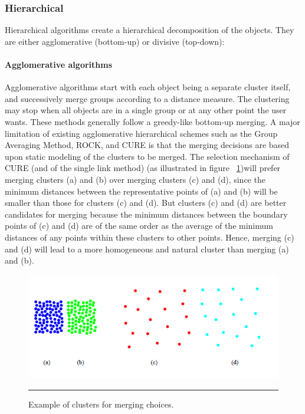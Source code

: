 \subsubsection{Hierarchical}
Hierarchical algorithms create a hierarchical decomposition of the objects. They are either
agglomerative (bottom-up) or divisive (top-down):
\paragraph{Agglomerative algorithms}
Agglomerative algorithms start with each object being a separate cluster itself, and successively
merge groups according to a distance measure. The clustering may stop when all objects are in
a single group or at any other point the user wants.
These methods generally follow a greedy-like bottom-up merging.
A major limitation of existing agglomerative hierarchical schemes such as the Group Averaging Method,
ROCK, and CURE is that the merging decisions are based upon static modeling of the clusters to
be merged. The selection mechanism of CURE (and of the single link method) (as illustrated in figure ~\ref{fig:hir_fail})will prefer merging clusters (a) and (b) over merging clusters (c) and (d), since the minimum distances between the representative points of (a) and (b) will be smaller than those for clusters (c) and
(d). But clusters (c) and (d) are better candidates for merging because the minimum distances between the boundary
points of (c) and (d) are of the same order as the average of the minimum distances of any points within these clusters
to other points. Hence, merging (c) and (d) will lead to a more homogeneous and natural cluster than merging (a) and
(b).
\begin{figure}[htbp]
	\centering
		\includegraphics{./Figures/clustering_3.png}
		\rule{35em}{0.5pt}
	\caption[Example of clusters for merging choices.]{Example of clusters for merging choices.}
	\label{fig:hir_fail}
\end{figure}

